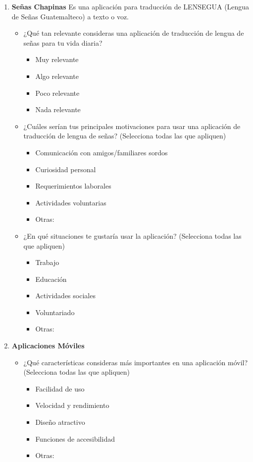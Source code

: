 \begin{enumerate}
    \item \textbf{Señas Chapinas}
    Es una aplicación para traducción de LENSEGUA (Lengua de Señas Guatemalteco) a texto o voz.
    \begin{itemize}
        \item ¿Qué tan relevante consideras una aplicación de traducción de lengua de señas para tu vida diaria?
        \begin{itemize}
            \item Muy relevante
            \item Algo relevante
            \item Poco relevante
            \item Nada relevante
        \end{itemize}
        \item ¿Cuáles serían tus principales motivaciones para usar una aplicación de traducción de lengua de señas? (Selecciona todas las que apliquen)
        \begin{itemize}
            \item Comunicación con amigos/familiares sordos
            \item Curiosidad personal
            \item Requerimientos laborales
            \item Actividades voluntarias
            \item Otras: \underline{\hspace{5cm}}
        \end{itemize}
        \item ¿En qué situaciones te gustaría usar la aplicación? (Selecciona todas las que apliquen)
        \begin{itemize}
            \item Trabajo
            \item Educación
            \item Actividades sociales
            \item Voluntariado
            \item Otras: \underline{\hspace{5cm}}
        \end{itemize}
    \end{itemize}

    \item \textbf{Aplicaciones Móviles}
    \begin{itemize}
        \item ¿Qué características consideras más importantes en una aplicación móvil? (Selecciona todas las que apliquen)
        \begin{itemize}
            \item Facilidad de uso
            \item Velocidad y rendimiento
            \item Diseño atractivo
            \item Funciones de accesibilidad
            \item Otras: \underline{\hspace{5cm}}
        \end{itemize}
    \end{itemize}


\end{enumerate}
